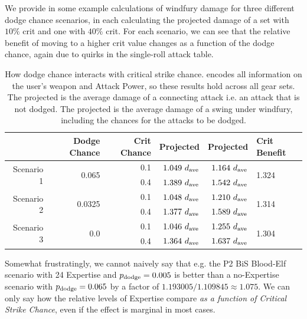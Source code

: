 We provide in  some example calculations of windfury damage for three different dodge chance scenarios, in each calculating the projected damage of a set with $10\%$ crit and one with $40\%$ crit.
For each scenario, we can see that the relative benefit of moving to a higher crit value changes as a function of the dodge chance, again due to quirks in the single-roll attack table.

\begin{table}[htb]
	\centering
	\begin{tabular}{ r | r | r | r | r | l }
		  \multicolumn{1}{c|}{}  & Dodge Chance & Crit Chance & Projected \dphys & Projected \dwf & Crit Benefit \\
		\hline \hline
		\multirow{2}{*}{Scenario 1}	 &	\multirow{2}{*}{0.065} & 0.1 & $1.049~d_{\mathrm{ave}} $ & $1.164~d_{\mathrm{ave}} $ & \multirow{2}{*}{1.324} \\
					&  & 0.4 & $1.389~d_{\mathrm{ave}} $ & $1.542~d_{\mathrm{ave}} $ & \\
		\hline
		
		\multirow{2}{*}{Scenario 2}	 &	\multirow{2}{*}{0.0325} & 0.1 & $1.048~d_{\mathrm{ave}} $ & $1.210~d_{\mathrm{ave}} $ & \multirow{2}{*}{1.314} \\
		&  & 0.4 & $1.377~d_{\mathrm{ave}} $ & $1.589~d_{\mathrm{ave}} $ & \\
		\hline
		
		\multirow{2}{*}{Scenario 3}	 &	\multirow{2}{*}{0.0} & 0.1 & $1.046~d_{\mathrm{ave}} $ & $1.255~d_{\mathrm{ave}} $ & \multirow{2}{*}{1.304} \\
		&  & 0.4 & $1.364~d_{\mathrm{ave}} $ & $1.637~d_{\mathrm{ave}} $ & \\
		\hline
		
	\end{tabular}
	\caption{How dodge chance interacts with critical strike chance.
		\dave encodes all information on the user's weapon and Attack Power, so these results hold across all gear sets.
	The projected \dphys is the average damage of a connecting attack i.e. an attack that is not dodged.
	The projected \dwf is the average damage of a swing under windfury, including the chances for the attacks to be dodged.}		
	\label{tab:wfautos}
\end{table}

Somewhat frustratingly, we cannot naively say that e.g. the P2 BiS Blood-Elf scenario with 24 Expertise and $p_{\mathrm{dodge}}  = 0.005$ is better than a no-Expertise scenario with $p_{\mathrm{dodge}}  = 0.065$ by a factor of $1.193005/1.109845 \approx 1.075$.
We can only say how the relative levels of Expertise compare \emph{as a function of Critical Strike Chance}, even if the effect is marginal in most cases.

